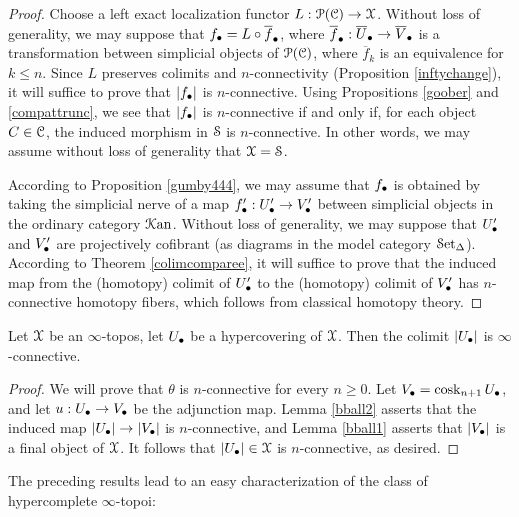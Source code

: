 \begin{proof}
Choose a left exact localization functor $L: \operatorname{\mathcal{P}}(\operatorname{\mathcal{C}}) \rightarrow \operatorname{\mathcal{X}}$. Without loss of generality, we may suppose that $f_{\bullet} = L \circ \overline{f}_{\bullet}$, where
$\overline{f}_{\bullet}: \overline{U}_{\bullet} \rightarrow \overline{V}_{\bullet}$ is
a transformation between simplicial objects of $\operatorname{\mathcal{P}}(\operatorname{\mathcal{C}})$, where $\overline{f}_{k}$ is an equivalence for $k \leq n$. Since $L$ preserves colimits and $n$-connectivity (Proposition \ref{inftychange}), it will suffice to prove that $|f_{\bullet}|$ is $n$-connective. Using Propositions \ref{goober} and \ref{compattrunc}, we see that $|f_{\bullet}|$ is $n$-connective if and only if, for each object $C \in \operatorname{\mathcal{C}}$, the induced morphism in $\operatorname{\mathcal{S}}$ is $n$-connective. In other words, we may assume without loss of generality that $\operatorname{\mathcal{X}} = \operatorname{\mathcal{S}}$.

According to Proposition \ref{gumby444}, we may assume that
$f_{\bullet}$ is obtained by taking the simplicial nerve of a map $f'_{\bullet}: U'_{\bullet} \rightarrow V'_{\bullet}$ between simplicial objects in the ordinary category $\operatorname{\mathcal{K}an}$.
Without loss of generality, we may suppose that
 $U'_{\bullet}$ and $V'_{\bullet}$ are projectively cofibrant (as diagrams in the model category $\operatorname{\mathcal{S}et_{\Delta}}$). According to Theorem \ref{colimcomparee}, it will suffice to prove that the induced map from the (homotopy) colimit of $U'_{\bullet}$ to the (homotopy) colimit of $V'_{\bullet}$ has $n$-connective homotopy fibers, which follows from classical homotopy theory.
\end{proof}

\begin{lemma}\label{fierminus}
Let $\operatorname{\mathcal{X}}$ be an $\infty$-topos, let $U_{\bullet}$ be a hypercovering of $\operatorname{\mathcal{X}}$.
Then the colimit $| U_{\bullet} |$ is $\infty$-connective.
\end{lemma}

\begin{proof}
We will prove that $\theta$ is $n$-connective for every $n \geq 0$. Let
$V_{\bullet} = \operatorname{cosk}_{n+1} U_{\bullet}$, and let
$u: U_{\bullet} \rightarrow V_{\bullet}$ be the adjunction map.
Lemma \ref{bball2} asserts that the induced map $|U_{\bullet}| \rightarrow |V_{\bullet}|$
is $n$-connective, and Lemma \ref{bball1} asserts that $| V_{\bullet} |$ is a final object of $\operatorname{\mathcal{X}}$. It follows that $| U_{\bullet} | \in \operatorname{\mathcal{X}}$ is $n$-connective, as desired.
\end{proof}

The preceding results lead to an easy characterization of the class of hypercomplete $\infty$-topoi:

